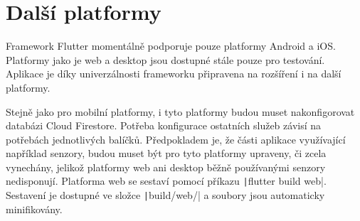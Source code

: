 \section{Další platformy}

Framework Flutter momentálně podporuje pouze platformy Android a iOS.
Platformy jako je web a desktop jsou dostupné stále pouze pro testování.
Aplikace je díky univerzálnosti frameworku připravena na rozšíření i na další
platformy.~\cite{flutter_deploy_web}

Stejně jako pro mobilní platformy,
i tyto platformy budou muset nakonfigorovat databázi Cloud Firestore.
Potřeba konfigurace ostatních služeb závisí na potřebách jednotlivých balíčků.
Předpokladem je,
že části aplikace využívající například senzory,
budou muset být pro tyto platformy upraveny,
či zcela vynechány,
jelikož platformy web ani desktop běžně používanými senzory nedisponují.
Platforma web se sestaví pomocí příkazu \texttt|flutter build web|.
Sestavení je dostupné ve složce \texttt|build/web/|
a soubory jsou automaticky minifikovány.
